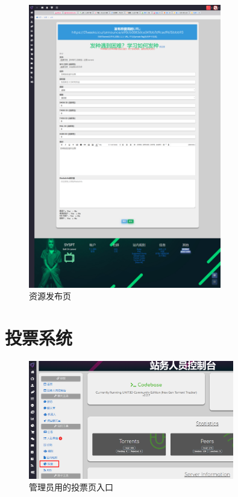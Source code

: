 \begin{figure}[h]
    \centering
    \includegraphics[width=0.75\textwidth]{support-files/5.2-upload-page.png}
    \caption{资源发布页}
    \label{fig:uploadpage}
\end{figure}

\newpage

\section{投票系统}


\begin{figure}[h]
    \centering
    \includegraphics[width=0.8\textwidth]{support-files/5.x-poll-dashboard-entrance.png}
    \caption{管理员用的投票页入口}
    \label{fig:pollentrance}
\end{figure}

